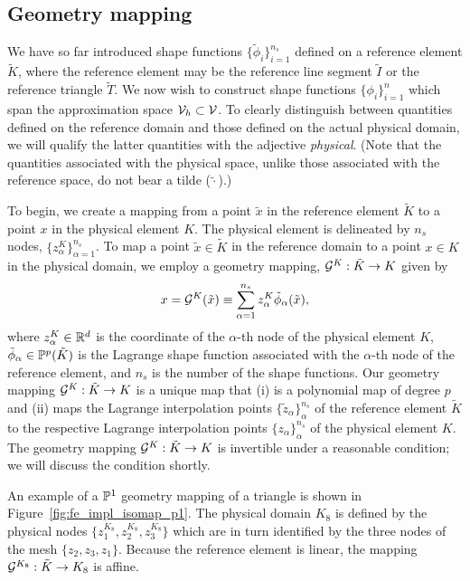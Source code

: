 \subsection{Geometry mapping}
\label{sec:fe_iso_map}
We have so far introduced shape functions $\{\tilde \phi_i\}_{i=1}^{n_s}$ defined on a reference element $\tilde K$, where the reference element may be the reference line segment $\tilde I$ or the reference triangle $\tilde T$. We now wish to construct shape functions $\{\phi_i\}_{i=1}^n$ which span the approximation space $\mathcal{V}_h \subset \mathcal{V}$.  To clearly distinguish between quantities defined on the reference domain and those defined on the actual physical domain, we will qualify the latter quantities with the adjective \emph{physical}. (Note that the quantities associated with the physical space, unlike those associated with the reference space, do not bear a tilde ($\tilde \cdot$).)

To begin, we create a mapping from a point $\tilde x$ in the reference element $\tilde K$ to a point $x$ in the physical element $K$.  The physical element is delineated by $n_s$ nodes, $\{ z^K_\alpha \}_{\alpha=1}^{n_s}$.  To map a point $\tilde x \in \tilde K$ in the reference domain to a point $x \in K$ in the physical domain, we employ a geometry mapping, $\mathcal{G}^K: \tilde K \to K$ given by 
\begin{equation}
  x = \mathcal{G}^K(\tilde x) \equiv \sum_{\alpha=1}^{n_s} z^K_\alpha \tilde \phi_\alpha(\tilde x) ,
  \label{eq:fe_iso_map}
\end{equation}
where $z^K_\alpha \in \mathbb{R}^d$ is the coordinate of the $\alpha$-th node of the physical element $K$, $\tilde \phi_\alpha \in \mathbb{P}^p(\tilde K)$ is the Lagrange shape function associated with the $\alpha$-th node of the reference element, and $n_s$ is the number of the shape functions.  Our geometry mapping $\mathcal{G}^K: \tilde K \to K$ is a unique map that (i) is a polynomial map of degree $p$ and (ii) maps the Lagrange interpolation points $\{ \tilde z_\alpha \}_{\alpha}^{n_s}$ of the reference element $\tilde K$ to the respective Lagrange interpolation points $\{ z_\alpha \}_{\alpha}^{n_s}$ of the physical element $K$. The geometry mapping $\mathcal{G}^K: \tilde K \to K$ is invertible under a reasonable condition; we will discuss the condition shortly.

An example of a $\mathbb{P}^1$ geometry mapping of a triangle is shown in Figure~\ref{fig:fe_impl_isomap_p1}.  The physical domain $K_8$ is defined by the physical nodes $\{ z_1^{K_8}, z_2^{K_8}, z_3^{K_8} \}$ which are in turn identified by the three nodes of the mesh $\{ z_2, z_3, z_1 \}$.  Because the reference element is linear, the mapping $\mathcal{G}^{K_8}: \tilde K \to K_8$ is affine.


